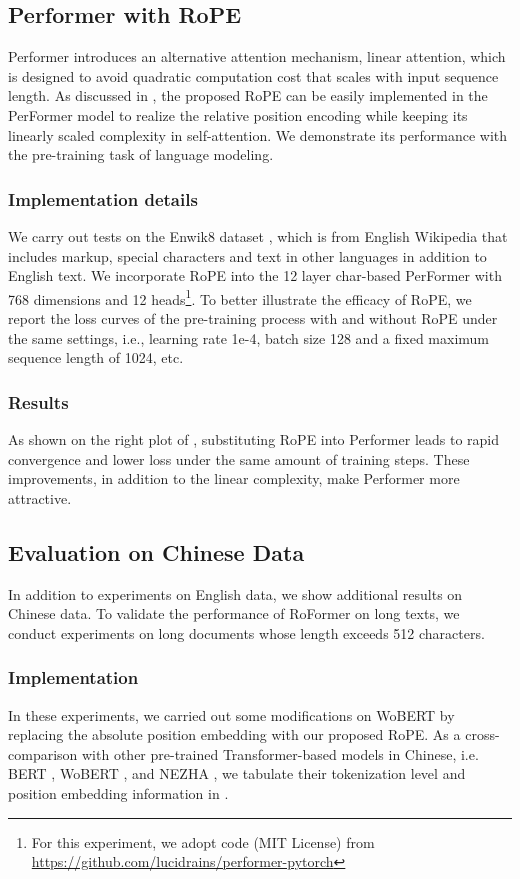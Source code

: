 \documentclass{article}
\begin{document}
\subsection{Performer with RoPE}\label{subsec:peformer}
Performer \cite{performer} introduces an alternative attention mechanism, linear attention, which is designed to avoid quadratic computation cost that scales with input sequence length. As discussed in , the proposed RoPE can be easily implemented in the PerFormer model to realize the relative position encoding while keeping its linearly scaled complexity in self-attention. We  demonstrate its performance with  the pre-training task of language modeling.

\subsubsection{Implementation details}
We carry out tests on the Enwik8 dataset \cite{enwik8}, which is from English Wikipedia that includes markup, special characters and text in other languages in addition to English text. We incorporate RoPE into the 12 layer char-based PerFormer with 768 dimensions and 12 heads\footnote{For this experiment, we adopt code (MIT License) from \url{https://github.com/lucidrains/performer-pytorch}}. 
To better illustrate the efficacy of RoPE,  we report the loss curves of the pre-training process with and without RoPE under the same settings, i.e., learning rate 1e-4, batch size 128 and a fixed maximum sequence length of 1024, etc. 

\subsubsection{Results} 
As shown on the right plot of , substituting RoPE into Performer leads to rapid convergence and lower loss under the same amount of training steps. These improvements, in addition to the linear complexity,  make Performer more attractive. 

\subsection{Evaluation on Chinese Data}\label{subsec:chinese}
In addition to experiments on English data, we show additional results on Chinese data.  To validate the performance of RoFormer on long texts, we conduct experiments on long documents whose length exceeds 512 characters.

\subsubsection{Implementation} 
In these experiments, we carried out some modifications on WoBERT \cite{zhuiyipretrainedmodels} by replacing the absolute position embedding with our proposed RoPE. As a cross-comparison with other pre-trained Transformer-based models in Chinese, i.e. BERT \cite{Devlin2019BERTPO}, WoBERT \cite{zhuiyipretrainedmodels}, and NEZHA \cite{nezha},  we tabulate their tokenization level and position embedding information in .
\end{document}
